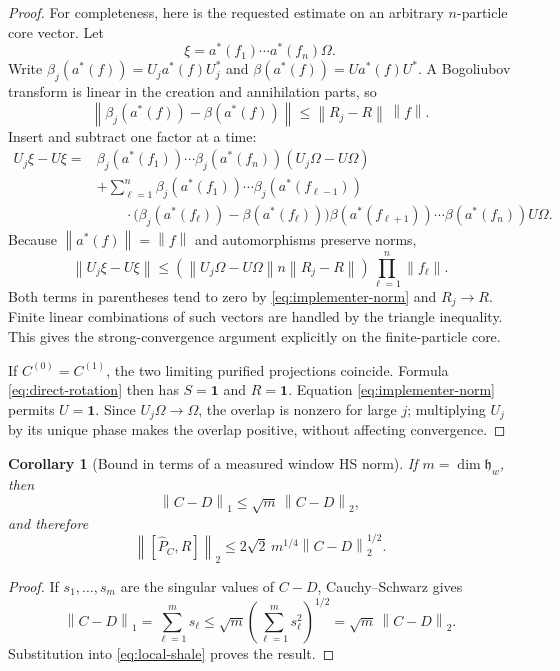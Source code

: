 \documentclass[11pt]{article}
\newtheorem{corollary}[theorem]{Corollary}
\theoremstyle{remark}
\newcommand{\id}{\mathbf 1}
\newcommand{\norm}[1]{\left\lVert #1\right\rVert}
\begin{document}
\begin{proof}
For completeness, here is the requested estimate on an arbitrary
$n$-particle core vector.  Let
\[
 \xi=a^*(f_1)\cdots a^*(f_n)\Omega .
\]
Write $\beta_j(a^*(f))=U_ja^*(f)U_j^*$ and
$\beta(a^*(f))=Ua^*(f)U^*$.  A Bogoliubov transform is linear in the
creation and annihilation parts, so
\[
 \norm{\beta_j(a^*(f))-\beta(a^*(f))}
 \le\norm{R_j-R}\,\norm{f}.
\tag{3.10}\label{eq:field-bound}
\]
Insert and subtract one factor at a time:
\[
\begin{aligned}
U_j\xi-U\xi
={}&
\beta_j(a^*(f_1))\cdots\beta_j(a^*(f_n))
  (U_j\Omega-U\Omega)\\
&+\sum_{\ell=1}^n
\beta_j(a^*(f_1))\cdots\beta_j(a^*(f_{\ell-1}))\\
&\qquad\cdot
\bigl(\beta_j(a^*(f_\ell))-\beta(a^*(f_\ell))\bigr)
\beta(a^*(f_{\ell+1}))\cdots\beta(a^*(f_n))U\Omega .
\end{aligned}
\]
Because $\norm{a^*(f)}=\norm f$ and automorphisms preserve norms,
\[
\norm{U_j\xi-U\xi}
\le
\left(
\norm{U_j\Omega-U\Omega}
n\norm{R_j-R}
\right)\prod_{\ell=1}^n\norm{f_\ell}.
\tag{3.11}\label{eq:nparticle}
\]
Both terms in parentheses tend to zero by
\eqref{eq:implementer-norm} and $R_j\to R$.  Finite linear combinations
of such vectors are handled by the triangle inequality.  This gives the
strong-convergence argument explicitly on the finite-particle core.

If $C^{(0)}=C^{(1)}$, the two limiting purified projections coincide.
Formula \eqref{eq:direct-rotation} then has $S=\id$ and $R=\id$.
Equation \eqref{eq:implementer-norm} permits $U=\id$.  Since
$U_j\Omega\to\Omega$, the overlap is nonzero for large $j$; multiplying
$U_j$ by its unique phase makes the overlap positive, without affecting
convergence.
\end{proof}

\begin{corollary}[Bound in terms of a measured window HS norm]
\label{cor:measured}
If $m=\dim\mathfrak h_w$, then
\[
 \norm{C-D}_1\le\sqrt m\,\norm{C-D}_2,
\]
and therefore
\[
 \norm{[\widehat P_C,R]}_2
 \le2\sqrt2\,m^{1/4}\norm{C-D}_2^{1/2}.
\tag{3.12}
\]
\end{corollary}

\begin{proof}
If $s_1,\ldots,s_m$ are the singular values of $C-D$, Cauchy--Schwarz
gives
\[
 \norm{C-D}_1=\sum_{\ell=1}^m s_\ell
\le\sqrt m\left(\sum_{\ell=1}^m s_\ell^2\right)^{1/2}
=\sqrt m\,\norm{C-D}_2.
\]
Substitution into \eqref{eq:local-shale} proves the result.
\end{proof}
\end{document}
